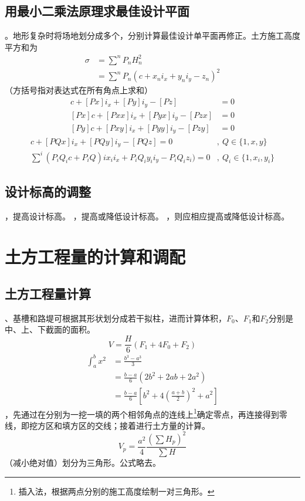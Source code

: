 \documentclass{book}
\begin{document}
\subsection{用最小二乘法原理求最佳设计平面}
。地形复杂时将场地划分成多个，分别计算最佳设计单平面再修正。土方施工高度平方和为
\begin{align*}
    \sigma & = \sum^n P_n H_n^2                  \\
           & = \sum^n P_n(c+x_ni_x+y_ni_y-z_n)^2
\end{align*}
（方括号指对表达式在所有角点上求和）
\begin{align*}
    [P]c + [Px]i_x + [Py]i_y - [Pz]     & = 0 \\
    [Px]c + [Pxx]i_x + [Pyx]i_y - [Pzx] & = 0 \\
    [Py]c + [Pxy]i_x + [Pyy]i_y - [Pzy] & = 0
\end{align*}
\begin{align*}
    [PQ]c + [PQx]i_x + [PQy]i_y - [PQz] = 0                        & ,\ Q \in \{1, x, y\}       \\
    \sum^i (P_iQ_ic + P_iQ)ix_ii_x + P_iQ_iy_ii_y - P_iQ_iz_i) = 0 & ,\ Q_i \in \{1, x_i, y_i\}
\end{align*}
\subsection{设计标高的调整}
，提高设计标高。
，提高或降低设计标高。
，则应相应提高或降低设计标高。
\section{土方工程量的计算和调配}
\subsection{土方工程量计算}
、基槽和路堤可根据其形状划分成若干拟柱，进而计算体积，$F_0$、$F_1$和$F_2$分别是中、上、下截面的面积。
$$
    V = \frac{H}{6}(F_1+4F_0+F_2)
$$
\begin{align*}
    \int_a^b x^2 & = \frac{b^3-a^3}{3}                          \\
                 & = \frac{b-a}{6} (2b^2+2ab+2a^2)              \\
                 & = \frac{b-a}{6} [b^2+4(\frac{a+b}{2})^2+a^2]
\end{align*}
，先通过在分别为一挖一填的两个相邻角点的连线上\footnote{插入法，根据两点分别的施工高度绘制一对三角形。}确定零点，再连接得到零线，即挖方区和填方区的交线；接着进行土方量的计算。
$$
    V_p = \frac{a^2}{4} \frac{(\sum H_p)^2}{\sum H}
$$
（减小绝对值）划分为三角形。公式略去。
\end{document}
